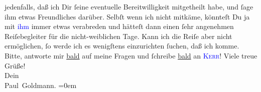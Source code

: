                jedenfalls, daß ich Dir ſeine eventuelle Bereitwilligkeit mitgetheilt habe, und  ſage ihm etwas Freundliches {\pb}darüber. Selbſt wenn ich nicht mitkäme, könnteſt Du
               ja mit \textcolor{blue}{ihm}{}\ledrightnote{{$\rightarrow$}\textcolor{blue}{Alfred Kerr}} immer etwas
               verabreden und hätteſt dann einen ſehr angenehmen Reiſebegleiter für die
               nicht-weiblichen Tage.\pend
           \pstart
           Kann ich die Reiſe aber nicht ermöglichen, ſo werde ich es wenigſtens einzurichten
               ſuchen, daß ich \label{K_L02920-4v}\label{K_L02920-4h} komme.\pend
           \pstart
           Bitte, antworte mir \uline{bald} auf meine Fragen und
               ſchreibe \uline{bald} an \textsc{\textcolor{blue}{Kerr}{}\ledrightnote{\textcolor{blue}{Alfred Kerr}}}!\pend
           \pstart
           Viele treue Grüße! {\\[\baselineskip]}Dein {\\[\baselineskip]}\spacefill\mbox{Paul Goldmann.}\pend
           \leftskip=0em{}\endnumbering{}\begin{anhang}\end{anhang}
      